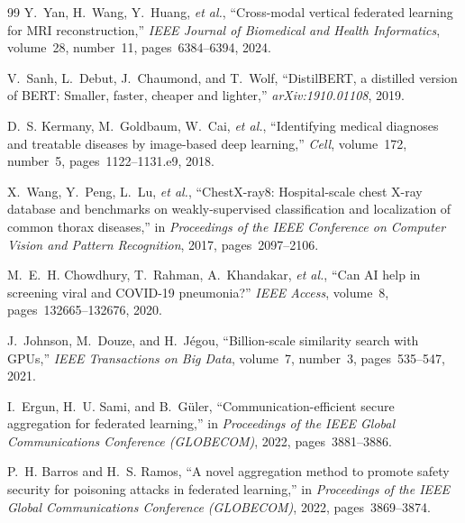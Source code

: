 \documentclass[letterpaper, conference]{IEEEtran}
\begin{document}
\begin{thebibliography}{99}
Y.~Yan, H.~Wang, Y.~Huang, \emph{et al.}, ``Cross-modal vertical federated learning for MRI reconstruction,'' \emph{IEEE Journal of Biomedical and Health Informatics}, volume~28, number~11, pages~6384--6394, 2024.

V.~Sanh, L.~Debut, J.~Chaumond, and T.~Wolf, ``DistilBERT, a distilled version of BERT: Smaller, faster, cheaper and lighter,'' \emph{arXiv:1910.01108}, 2019.

D.~S. Kermany, M.~Goldbaum, W.~Cai, \emph{et al.}, ``Identifying medical diagnoses and treatable diseases by image-based deep learning,'' \emph{Cell}, volume~172, number~5, pages~1122--1131.e9, 2018.

X.~Wang, Y.~Peng, L.~Lu, \emph{et al.}, ``ChestX-ray8: Hospital-scale chest X-ray database and benchmarks on weakly-supervised classification and localization of common thorax diseases,'' in \emph{Proceedings of the IEEE Conference on Computer Vision and Pattern Recognition}, 2017, pages~2097--2106.

M.~E.~H. Chowdhury, T.~Rahman, A.~Khandakar, \emph{et al.}, ``Can AI help in screening viral and COVID-19 pneumonia?'' \emph{IEEE Access}, volume~8, pages~132665--132676, 2020.

J.~Johnson, M.~Douze, and H.~J\'egou, ``Billion-scale similarity search with GPUs,'' \emph{IEEE Transactions on Big Data}, volume~7, number~3, pages~535--547, 2021.

I.~Ergun, H.~U. Sami, and B.~G\"uler, ``Communication-efficient secure aggregation for federated learning,'' in \emph{Proceedings of the IEEE Global Communications Conference (GLOBECOM)}, 2022, pages~3881--3886.

P.~H. Barros and H.~S. Ramos, ``A novel aggregation method to promote safety security for poisoning attacks in federated learning,'' in \emph{Proceedings of the IEEE Global Communications Conference (GLOBECOM)}, 2022, pages~3869--3874.  \end{thebibliography}  
\end{document}
